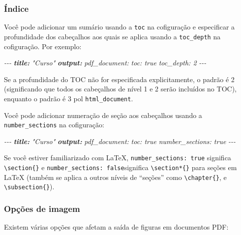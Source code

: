 \documentclass[
]{book}
\newenvironment{Shaded}{\begin{snugshade}}{\end{snugshade}}
\newcommand{\AnnotationTok}[1]{\textcolor[rgb]{0.56,0.35,0.01}{\textbf{\textit{#1}}}}
\newcommand{\CommentTok}[1]{\textcolor[rgb]{0.56,0.35,0.01}{\textit{#1}}}
\begin{document}
\hypertarget{uxedndice}{%
\subsubsection{Índice}\label{uxedndice}}

Você pode adicionar um sumário usando a \texttt{toc} na cofiguração e especificar a profundidade dos cabeçalhos aos quais se aplica usando a \texttt{toc\_depth} na cofiguração. Por exemplo:

\begin{Shaded}
\begin{Highlighting}[]
\CommentTok{{-}{-}{-}}
\AnnotationTok{title:}\CommentTok{ "Curso"}
\AnnotationTok{output:}
\CommentTok{  pdf\_document:}
\CommentTok{    toc: true}
\CommentTok{    toc\_depth: 2}
\CommentTok{{-}{-}{-}}
\end{Highlighting}
\end{Shaded}

Se a profundidade do TOC não for especificada explicitamente, o padrão é 2 (significando que todos os cabeçalhos de nível 1 e 2 serão incluídos no TOC), enquanto o padrão é 3 pol \texttt{html\_document}.

Você pode adicionar numeração de seção aos cabeçalhos usando a \texttt{number\_sections} na cofiguração:

\begin{Shaded}
\begin{Highlighting}[]
\CommentTok{{-}{-}{-}}
\AnnotationTok{title:}\CommentTok{ "Curso"}
\AnnotationTok{output:}
\CommentTok{  pdf\_document:}
\CommentTok{    toc: true}
\CommentTok{    number\_sections: true}
\CommentTok{{-}{-}{-}}
\end{Highlighting}
\end{Shaded}

Se você estiver familiarizado com LaTeX, \texttt{number\_sections:\ true} significa \texttt{\textbackslash{}section\{\}} e \texttt{number\_sections:\ false}significa \texttt{\textbackslash{}section*\{\}} para seções em LaTeX (também se aplica a outros níveis de ``seções'' como \texttt{\textbackslash{}chapter\{\}}, e \texttt{\textbackslash{}subsection\{\}}).

\hypertarget{opuxe7uxf5es-de-imagem}{%
\subsubsection{Opções de imagem}\label{opuxe7uxf5es-de-imagem}}

Existem várias opções que afetam a saída de figuras em documentos PDF:
\end{document}
